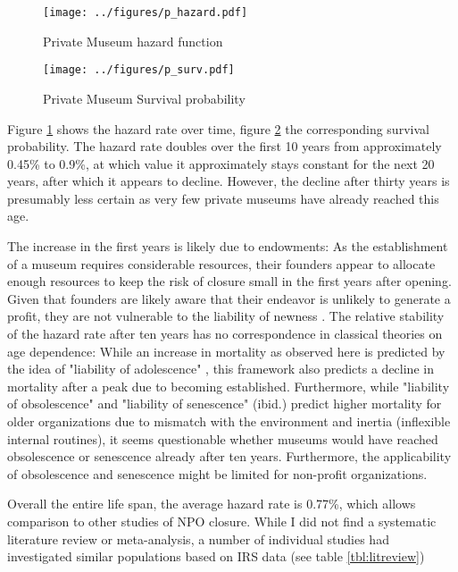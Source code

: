 \documentclass[12pt]{article}
\begin{document}
\begin{figure}[htbp]
\centering
\texttt{[image: ../figures/p\_hazard.pdf]}
\caption{\label{fig:p_hazard}Private Museum hazard function}
\end{figure}

\begin{figure}[htbp]
\centering
\texttt{[image: ../figures/p\_surv.pdf]}
\caption{\label{fig:p_surv}Private Museum Survival probability}
\end{figure}


Figure \ref{fig:p_hazard} shows the hazard rate over time, figure \ref{fig:p_surv} the corresponding survival probability.
The hazard rate doubles over the first 10 years from approximately 0.45\% to 0.9\%, at which value it approximately stays constant for the next 20 years, after which it appears to decline.
However, the decline after thirty years is presumably less certain as very few private museums have already reached this age.


The increase in the first years is likely due to endowments: As the establishment of a museum requires considerable resources, their founders appear to allocate enough resources to keep the risk of closure small in the first years after opening.
Given that founders are likely aware that their endeavor is unlikely to generate a profit, they are not vulnerable to the liability of newness \parencite{Stinchcombe_1965_structure}.
The relative stability of the hazard rate after ten years has no correspondence in classical theories on age dependence:
While an increase in mortality as observed here is predicted by the idea of "liability of adolescence" \parencite{Carroll_Khessina_2019_demography}, this framework also predicts a decline in mortality after a peak due to becoming established.
Furthermore, while "liability of obsolescence" and "liability of senescence" (ibid.) predict higher mortality for older organizations due to mismatch with the environment and inertia (inflexible internal routines), it seems questionable whether museums would have reached obsolescence or senescence already after ten years.
Furthermore, the applicability of obsolescence and senescence might be limited for non-profit organizations.


Overall the entire life span, the average hazard rate is 0.77\%, which allows comparison to other studies of NPO closure.
While I did not find a systematic literature review or meta-analysis, a number of individual studies had investigated similar populations based on IRS data (see table \ref{tbl:litreview}) 
\end{document}
